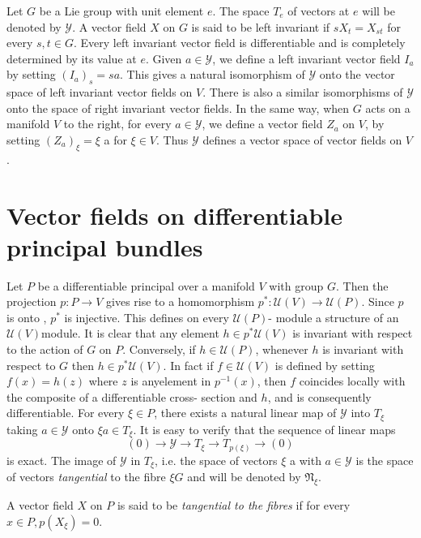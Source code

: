 Let $G$ be a Lie group with unit element $e$. The space $T_e$ of
vectors at $e$ will be denoted by $\mathscr{Y}$. A vector field $X$ on
$G$ is said to be left invariant if $sX_t = X_{st}$ for every $s , t
\in G$. Every left invariant vector field is differentiable and is
completely determined by its value at $e$. Given $a \in \mathscr{Y}$,
we define a left invariant vector field $I_a$ by setting $(I_a)_s =
sa$.  This gives a natural isomorphism of $\mathscr{Y} $ onto the
vector space of left invariant vector fields on $V$. There is also a
similar isomorphisms of $\mathscr{Y}$ onto the space of right
invariant vector fields. In the same way, when $G$ acts on a manifold
$V$ to the right, for every $a \in \mathscr{Y}$, we define a vector
field $Z_a$ on $V$, by setting $(Z_a)_\xi = \xi $ a for $\xi \in
V$. Thus $\mathscr{Y} $ defines a vector space of vector fields on
$V$.  

\section{Vector fields on differentiable principal bundles}\label{chap2:sec8}

Let $P$ be a differentiable principal over a manifold $V$ with group
$G$. Then the projection $p:P \to V $ gives rise to a homomorphism
$p^* : \mathscr{U}(V) \to \mathscr{U } (P)$. Since $p$ is onto , $p^*$
is injective. This defines on every $\mathscr{U}(P)$- module a
structure of an $\mathscr{U}(V)$module. It is clear that any element
$h \in p^* \mathscr{U} (V)$ is invariant with respect to the action of
$G$ on $P$. Conversely, if $h \in \mathscr{U}(P)$, whenever $h$ is
invariant with respect to $G$ then $h \in p^* \mathscr{U}(V)$. In fact
if $f \in \mathscr{U}(V)$ is defined by setting $f(x) = h (z)$ where
$z$ is any\pageoriginale element in $p^{-1}(x)$, then $f$ coincides locally with the
composite of a differentiable cross- section and $h$, and is
consequently differentiable. For every $\xi \in P$, there exists a
natural linear map of $\mathscr{Y}$ into $T_\xi$ taking  $ a \in
\mathscr{Y}$ onto $\xi a \in T_{ \xi}$. It is easy to verify that the
sequence of linear maps  
$$
(0) \to\mathscr{Y } \to T_\xi \to T_{p (\xi)} \to  (0)
$$
is exact. The image of $\mathscr{Y}$ in $T_\xi$, i.e. the space of
vectors $\xi$ a with $a \in \mathscr{Y}$ is the space of vectors
\textit{ tangential } to the fibre $\xi G$ and will be denoted by
$\mathfrak{N}_\xi$.  

\begin{defn}\label{chap2:sec8:def6} %
  A vector field $X$ on $P$ is said to be {\em tangential to the
    fibres } if for every $x \in P, p (X_\xi) = 0 $.  
\end{defn}

